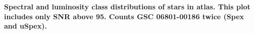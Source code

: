 {\bf  Spectral and luminosity class distributions of stars in atlas. This plot includes only SNR above 95. Counts GSC 06801-00186 twice (Spex and uSpex).\label{fig:hiso-spt-type}}